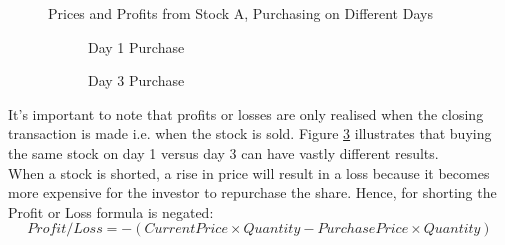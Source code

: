 \documentclass[a4paper,12pt]{report}
\numberwithin{equation}{section}
\theoremstyle{definition}
\begin{document}
\datatable
{}\datatable
\begin{figure}[H]
  \centering
  \centerline{Prices and Profits from Stock A, Purchasing on Different Days}
  \par\medskip
  \begin{subfigure}{.475\linewidth}
    \centering
  \caption{Day 1 Purchase}
  \label{graph: prices_and_profits}
\end{subfigure}%
\hfill%
\begin{subfigure}{.475\linewidth}
  \centering
    \caption{Day 3 Purchase}
    \label{graph: prices_and_profits2}
  \end{subfigure}
  \caption{}
  \label{figure: prices_and_profits_main}
\end{figure}

It's important to note that profits or losses are only realised when the closing transaction is made i.e. when the stock is sold. Figure \ref{figure: prices_and_profits_main} illustrates that buying the same stock on day 1 versus day 3 can have vastly different results. \\

When a stock is shorted, a rise in price will result in a loss because it becomes more expensive for the investor to repurchase the share. Hence, for shorting the Profit or Loss formula is negated:
\begin{equation*}
  Profit/Loss = -(Current Price \times Quantity - Purchase Price \times Quantity)
\end{equation*}
\end{document}
